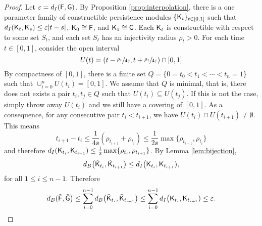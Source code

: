 \documentclass[12pt]{article}
\begin{document}
\begin{proof}
Let $\varepsilon = d_I({\mathsf{F}}, {\mathsf{G}})$. 
By Proposition \ref{prop:interpolation}, there is a one parameter family of constructible persistence modules 
$\{{\mathsf{K}}_t\}_{t \in [0,1]}$ such that
$d_I({\mathsf{K}}_t, {\mathsf{K}}_s) \leq \varepsilon |t-s|$, ${\mathsf{K}}_0 \cong {\mathsf{F}}$, and ${\mathsf{K}}_1 \cong {\mathsf{G}}$. 
Each ${\mathsf{K}}_t$ is constructible with respect to some set $S_t$, and each set $S_t$ has
an injectivity radius $\rho_t > 0$.
For each time $t \in [0,1]$, consider the open interval
$$U(t) = ( t-\sfrac{\rho_t}{4\varepsilon},t+\sfrac{\rho_t}{4\varepsilon} ) \cap [0,1]$$
By compactness of $[0,1]$, there is a finite set
$Q = \{ 0 = t_0 < t_1 < \cdots < t_n = 1 \}$
such that $\cup_{i=0}^n U(t_i) = [0,1]$.
We assume that $Q$ is minimal, that is, there does not exists a pair $t_i, t_j \in Q$ such that
$U(t_i) \subseteq U(t_j)$.
If this is not the case, simply throw away $U(t_i)$ and we still have a covering of $[0,1]$.
As a consequence, for any consecutive pair $t_i < t_{i+1}$, we have $U(t_i) \cap U(t_{i+1}) \neq \emptyset$.
This means
$$t_{i+1} - t_i \leq \frac{1}{4\ee} (\rho_{t_{i+1}}+\rho_{t_i}) \leq \frac{1}{2\ee}
\max\{\rho_{t_{i+1}},\rho_{t_i}\}$$
and therefore $d_I( {\mathsf{K}}_{t_{i}}, {\mathsf{K}}_{t_{i+1}}) \leq \frac{1}{2} \max \{\rho_{t_{i}},\rho_{t_{i+1}} \}$. 
By Lemma \ref{lem:bijection}, 
$$ d_B \big( \tilde {{\mathsf{K}}}_{t_{i}},\tilde {{\mathsf{K}}}_{t_{i+1}} \big) \leq 
d_I \big( {\mathsf{K}}_{t_{i}}, {\mathsf{K}}_{t_{i+1}}),$$ 
for all $1\leq i \leq n-1$. 
Therefore 
$$d_B( \tilde {{\mathsf{F}}}, \tilde {{\mathsf{G}}} \big) \leq 
\sum_{i=0}^{n-1} d_B \big( \tilde {{\mathsf{K}}}_{t_{i}},\tilde {{\mathsf{K}}}_{t_{i+1}} \big) \leq
\sum_{i=0}^{n-1} d_I \big( {\mathsf{K}}_{t_{i}}, {\mathsf{K}}_{t_{i+1}}) \leq \varepsilon.$$  
\end{proof}

\newpage 

{}

\end{document}
